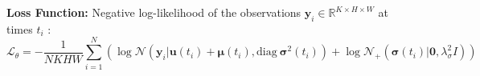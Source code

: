 \documentclass[landscape,a0paper,fontscale=0.292]{baposter}
\begin{document}
\begin{poster}
{    \textbf{\color{blue}Loss Function:} Negative log-likelihood of the observations $\mathbf{y}_i \in \mathbb{R}^{K \times H \times W}$ at times $t_i$ :
    \vspace{-1em}
    \begin{equation*}
        \mathcal{L}_{\theta} = - \frac{1}{NKHW} \sum_{i=1}^{N} \left( \log \mathcal{N}\left(\mathbf{y}_{i}|\mathbf{u}(t_{i}) + \boldsymbol{\mu}(t_{i}), \text{diag}\ \boldsymbol{\sigma}^{2}(t_{i})\right) + \log \mathcal{N}_{+}\left(\boldsymbol{\sigma}(t_{i})|\boldsymbol{0},\lambda_{\sigma}^{2}I\right) \right)
    \end{equation*}

}
\end{poster}
\end{document}
